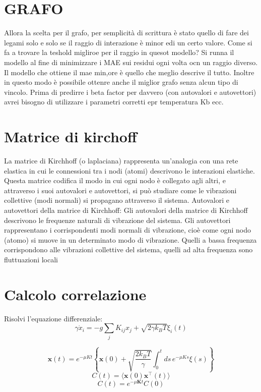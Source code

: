 \documentclass[Lau,binding=0.6cm,oneside,noexaminfo]{sapthesis}
\begin{document}
\section{GRAFO}
Allora la scelta per il grafo, per semplicità di scrittura è stato quello di fare dei legami solo e solo se il raggio di interazione è minor edi un certo valore. Come si fa a trovare la teshold migliroe per il raggio in quesot modello?
Si runna il modello al fine di minimizzare i MAE sui residui ogni volta ocn un raggio diverso. Il modello che ottiene il mae min,ore è quello che meglio descrive il tutto.
Inoltre in questo modo è possibile ottenre anche il miglior grafo senza alcun tipo di vincolo.
Prima di predirre i beta factor per davvero (con autovalori e autovettori) avrei bisogno di utilizzare i parametri corretti epr temperatura Kb ecc.

\section{Matrice di kirchoff}
La matrice di Kirchhoff (o laplaciana) rappresenta un'analogia con una rete elastica in cui le connessioni tra i nodi (atomi) descrivono le interazioni elastiche. Questa matrice codifica il modo in cui ogni nodo è collegato agli altri, e attraverso i suoi autovalori e autovettori, si può studiare come le vibrazioni collettive (modi normali) si propagano attraverso il sistema.
Autovalori e autovettori della matrice di Kirchhoff:
Gli autovalori della matrice di Kirchhoff descrivono le frequenze naturali di vibrazione del sistema.
Gli autovettori rappresentano i corrispondenti modi normali di vibrazione, cioè come ogni nodo (atomo) si muove in un determinato modo di vibrazione.
Quelli a bassa frequenza corrispondono alle vibrazioni collettive del sistema, quelli ad alta frequenza sono fluttuazioni locali 
\section{Calcolo correlazione}
Risolvi l'equazione differenziale:
\begin{equation}
    \gamma \dot{x}_i = -g \sum_j K_{ij} x_j + \sqrt{2 \gamma k_B T} \xi_i(t)
    \end{equation}
    
\begin{equation}
    \mathbf{x}(t) = e^{-\mu K t} \left\{ \mathbf{x}(0) + \sqrt{\frac{2k_B T}{\gamma}} \int_0^t ds \, e^{-\mu K s} \xi(s) \right\}
    \end{equation}
\begin{equation}
    C(t) = \langle \mathbf{x}(0) \mathbf{x}^\top(t) \rangle
    \end{equation}
\begin{equation}
    C(t) = e^{-\mu \mathbf{K} t} C(0)
    \end{equation}
        
\end{document}
